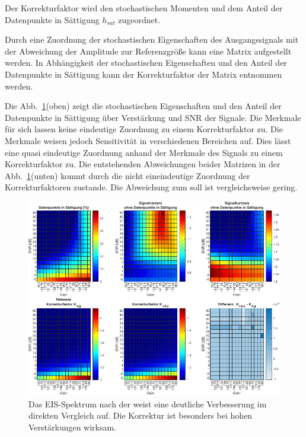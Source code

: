 Der Korrekturfaktor wird den stochastischen Momenten und dem Anteil der Datenpunkte in Sättigung $h_{sat}$ zugeordnet.

Durch eine Zuordnung der stochastischen Eigenschaften des Ausgangssignals mit der Abweichung der Amplitude zur Referenzgröße kann eine Matrix aufgestellt werden. In Abhängigkeit der stochastischen Eigenschaften und den Anteil der Datenpunkte in Sättigung kann der Korrekturfaktor der Matrix entnommen werden. 


Die Abb.~\ref{fig:lut}(oben) zeigt die stochastischen Eigenschaften und den Anteil der Datenpunkte in Sättigung über Verstärkung und SNR der Signale. Die Merkmale für sich lassen keine eindeutige Zuordnung zu einem Korrekturfaktor zu. Die Merkmale weisen jedoch Sensitivität in verschiedenen Bereichen auf. Dies lässt eine quasi eindeutige Zuordnung anhand der Merkmale des Signals zu einem Korrekturfaktor zu. Die entstehenden Abweichungen beider Matrizen in der Abb.~\ref{fig:lut}(unten) kommt durch die nicht eineindeutige Zuordnung der Korrekturfaktoren zustande. Die Abweichung zum soll ist vergleichsweise gering.

\begin{figure}[h!]
	\centering
	\includegraphics[width=.9\textwidth]{../img/lut.pdf}
	\caption{Das EIS-Spektrum nach der weist eine deutliche Verbesserung im direkten Vergleich auf. Die Korrektur ist besonders bei hohen Verstärkungen wirksam. }
	\label{fig:lut} 
\end{figure}


